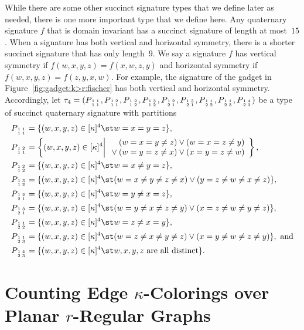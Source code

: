 \documentclass[11pt]{article}
\newcommand{\subMat}[4]{\mbox{\scriptsize $\begin{smallmatrix} #1 & #4 \\ #2 & #3 \end{smallmatrix}$}}
\begin{document}
While there are some other succinct signature types that we define later as needed,
there is one more important type that we define here.
Any quaternary signature $f$ that is domain invariant has a succinct signature of length at most~$15$.
When a signature has both vertical and horizontal symmetry,
there is a shorter succinct signature that has only length~$9$.
We say a signature $f$ has vertical symmetry if $f(w,x,y,z) = f(x,w,z,y)$ and horizontal symmetry if $f(w,x,y,z) = f(z,y,x,w)$.
For example,
the signature of the gadget in Figure~\ref{fig:gadget:k>r:fischer} has both vertical and horizontal symmetry.
Accordingly, let
$\tau_4 = (
P_{\subMat{1}{1}{1}{1}},
P_{\subMat{1}{1}{1}{2}},
P_{\subMat{1}{1}{2}{2}},
P_{\subMat{1}{1}{2}{3}},
P_{\subMat{1}{2}{1}{2}},
P_{\subMat{1}{2}{1}{3}},
P_{\subMat{1}{2}{2}{1}},
P_{\subMat{1}{2}{3}{1}},
P_{\subMat{1}{2}{3}{4}})$
be a type of succinct quaternary signature with partitions
\begin{align*}
 P_{\subMat{1}{1}{1}{1}} &= \{(w,x,y,z) \in [\kappa]^4 \st w = x = y = z\},\\
 P_{\subMat{1}{1}{1}{2}} &= \left\{(w,x,y,z) \in [\kappa]^4 \middle|
 \begin{array}{r}
  (w = x = y \ne z) \lor (w = x = z \ne y)\\
  {} \lor (w = y = z \ne x) \lor (x = y = z \ne w)
 \end{array}
 \right\},\\
 P_{\subMat{1}{1}{2}{2}} &= \{(w,x,y,z) \in [\kappa]^4 \st w = x \ne y = z\},\\
 P_{\subMat{1}{1}{2}{3}} &= \{(w,x,y,z) \in [\kappa]^4 \st (w = x \ne y \ne z \ne x) \lor (y = z \ne w \ne x \ne z)\},\\
 P_{\subMat{1}{2}{1}{2}} &= \{(w,x,y,z) \in [\kappa]^4 \st w = y \ne x = z\},\\
 P_{\subMat{1}{2}{1}{3}} &= \{(w,x,y,z) \in [\kappa]^4 \st (w = y \ne x \ne z \ne y) \lor (x = z \ne w \ne y \ne z)\},\\
 P_{\subMat{1}{2}{2}{1}} &= \{(w,x,y,z) \in [\kappa]^4 \st w = z \ne x = y\},\\
 P_{\subMat{1}{2}{3}{1}} &= \{(w,x,y,z) \in [\kappa]^4 \st (w = z \ne x \ne y \ne z) \lor (x = y \ne w \ne z \ne y)\}, \text{ and}\\
 P_{\subMat{1}{2}{3}{4}} &= \{(w,x,y,z) \in [\kappa]^4 \st w, x, y, z \text{ are all distinct}\}.
\end{align*}

\section{Counting Edge \texorpdfstring{$\kappa$}{kappa}-Colorings over Planar \texorpdfstring{$r$}{r}-Regular Graphs} \label{sec:coloring}
\end{document}
